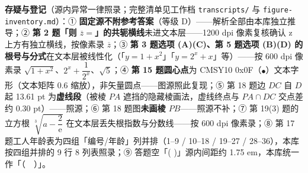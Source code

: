 \begin{gktip}
\textbf{存疑与登记}（源内异常一律照录；完整清单见工作档 \texttt{transcripts/} 与 \texttt{figure-inventory.md}）：① \textbf{固定源不附参考答案}（等级 D）——解析全部由本库独立推导；② \textbf{第 2 题「则 \(\overline{z}=\)」的共轭横线}未进文本层——1200 dpi 像素复核确认 z 上方有独立横线，按像素录 \(\overline{z}\)；③ \textbf{第 3 题选项 (A)(C)、第 5 题选项 (B)(D) 的根号与分式}在文本层被线性化（「\(y=1+x^2\)」「\(y=2^x+x\)」等）——按 600 dpi 像素录 \(\sqrt{1+x^2}\)、\(2^x+\dfrac{1}{2^x}\)、\(\sqrt{5}\)；④ \textbf{第 15 题圆心点}为 CMSY10 0x0F（\(\bullet\)）文本字形（文本矩阵 0.6 缩放），非矢量圆点——图源照此复现；⑤ 第 18 题边 \(DC\) 自 \(D\) 起 13.61 pt 为\textbf{虚线段}（被棱 \(PA\) 遮挡的隐藏棱画法，虚线终点与 \(PA\cap DC\) 交点差约 0.30 pt）——照源；⑥ 第 18 题图\textbf{未画棱 \(PB\)}——照源不补；⑦ 第 19(3) 题的立方根 \(\sqrt[3]{a-\dfrac{2}{\mathrm{e}}}\) 在文本层丢失根指数与分数线——按 600 dpi 像素录；⑧ 第 17 题工人年龄表为四组「编号/年龄」列并排（1–9 / 10–18 / 19–27 / 28–36），本库按四组并排的 9 行 8 列表照录；⑨ 答题空「( )」源内间距约 1.75 em，本库统一作「（　）」。
\end{gktip}



